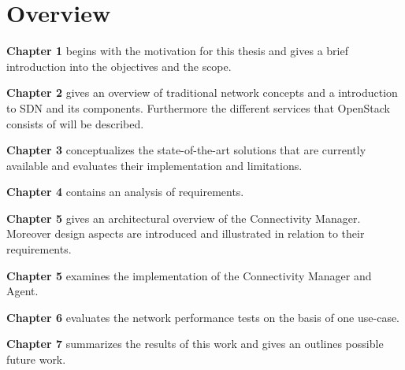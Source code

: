 \newpage

\section{Overview}

\textbf{Chapter 1} begins with the motivation for this thesis and gives a brief introduction into the objectives and the scope.

\textbf{Chapter 2} gives an overview of traditional network concepts and a introduction to SDN and its components. Furthermore the different services that OpenStack consists of will be described.

\textbf{Chapter 3} conceptualizes the state-of-the-art solutions that are currently available and evaluates their implementation and limitations.

\textbf{Chapter 4} contains an analysis of requirements.

\textbf{Chapter 5} gives an architectural overview of the Connectivity Manager. Moreover design aspects are introduced and illustrated in relation to their requirements.

\textbf{Chapter 5} examines the implementation of the Connectivity Manager and Agent.

\textbf{Chapter 6} evaluates the network performance tests on the basis of one use-case.

\textbf{Chapter 7} summarizes the results of this work and gives an outlines possible future work.


